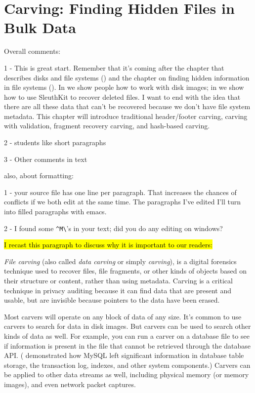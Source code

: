 \chapter{Carving: Finding Hidden Files in Bulk Data}

\color{red} 
Overall comments:

1 - This is great start. Remember that it's coming after the chapter
that describes disks and file systems () and the
chapter on finding hidden information in file systems
(). In  we show people how to
work with disk images; in  we show how to use
SleuthKit to recover deleted files. I want  to
end with the idea that there are all these data that can't be
recovered because we don't have file system metadata. This chapter
will introduce traditional header/footer carving, carving with
validation, fragment recovery carving, and hash-based carving.

2 - students like short paragraphs

3 - Other comments in text

also, about formatting:

1 - your source file has one line per paragraph. That increases the
chances of conflicts if we both edit at the same time. The paragraphs
I've edited I'll turn into filled paragraphs with emacs. 

2 - I found some \verb+^M\+'s in your text; did you do any editing on windows?

\color{black}


\hl{I recast this paragraph to discuss why it is important to our
  readers:}

\emph{File carving} (also called \emph{data carving} or simply
\emph{carving}), is a digital forensics technique used to recover
files, file fragments, or other kinds of objects based on their
structure or content, rather than using metadata. Carving is a
critical technique in privacy auditing because it can find data that
are present and usable, but are invisible because pointers to the
data have been erased.

Most carvers will operate on any block of data of any size. It's
common to use carvers to search for data in disk images. But carvers
can be used to search other kinds of data as well. For example, you
can run a carver on a database file to see if information is present
in the file that cannot be retrieved through the database API.
( demonstrated how MySQL left significant information
in database table storage, the transaction log, indexes, and other
system components.) Carvers can be applied to other data streams as
well, including physical memory (or memory images), and even network
packet captures.

